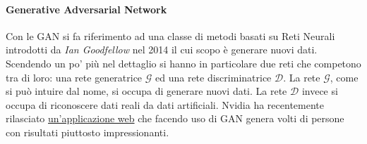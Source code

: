 \paragraph{Generative Adversarial Network}
Con le \acf{GAN} si fa riferimento ad una classe di metodi basati su Reti Neurali introdotti da \textit{Ian Goodfellow} \cite{goodfellow2014generative} nel 2014 il cui scopo è generare nuovi dati. Scendendo un po' più nel dettaglio si hanno in particolare due reti che competono tra di loro: una rete generatrice $\mathcal{G}$ ed una rete discriminatrice $\mathcal{D}$. La rete $\mathcal{G}$, come si può intuire dal nome, si occupa di generare nuovi dati. La rete $\mathcal{D}$ invece si occupa di riconoscere dati reali da dati artificiali. Nvidia ha recentemente rilasciato \href{https://www.thispersondoesnotexist.com/}{un'applicazione web} \cite{Karras2019stylegan2} che facendo uso di \ac{GAN} genera volti di persone con risultati piuttosto impressionanti. 

